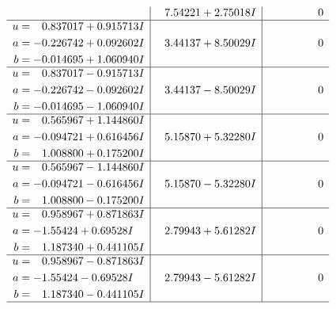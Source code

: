 \documentclass[1p]{elsarticle_modified}
\theoremstyle{definition}
\begin{document}
$$\begin{array}{c|c|c}
 & \phantom{-}7.54221 + 2.75018 I & \phantom{-0.000000 } 0 \\ \hline\begin{aligned}
u &= \phantom{-}0.837017 + 0.915713 I \\
a &= -0.226742 + 0.092602 I \\
b &= -0.014695 + 1.060940 I\end{aligned}
 & \phantom{-}3.44137 + 8.50029 I & \phantom{-0.000000 } 0 \\ \hline\begin{aligned}
u &= \phantom{-}0.837017 - 0.915713 I \\
a &= -0.226742 - 0.092602 I \\
b &= -0.014695 - 1.060940 I\end{aligned}
 & \phantom{-}3.44137 - 8.50029 I & \phantom{-0.000000 } 0 \\ \hline\begin{aligned}
u &= \phantom{-}0.565967 + 1.144860 I \\
a &= -0.094721 + 0.616456 I \\
b &= \phantom{-}1.008800 + 0.175200 I\end{aligned}
 & \phantom{-}5.15870 + 5.32280 I & \phantom{-0.000000 } 0 \\ \hline\begin{aligned}
u &= \phantom{-}0.565967 - 1.144860 I \\
a &= -0.094721 - 0.616456 I \\
b &= \phantom{-}1.008800 - 0.175200 I\end{aligned}
 & \phantom{-}5.15870 - 5.32280 I & \phantom{-0.000000 } 0 \\ \hline\begin{aligned}
u &= \phantom{-}0.958967 + 0.871863 I \\
a &= -1.55424 + 0.69528 I \\
b &= \phantom{-}1.187340 + 0.441105 I\end{aligned}
 & \phantom{-}2.79943 + 5.61282 I & \phantom{-0.000000 } 0 \\ \hline\begin{aligned}
u &= \phantom{-}0.958967 - 0.871863 I \\
a &= -1.55424 - 0.69528 I \\
b &= \phantom{-}1.187340 - 0.441105 I\end{aligned}
 & \phantom{-}2.79943 - 5.61282 I & \phantom{-0.000000 } 0\\
 \hline 
 \end{array}$$\newpage$$\begin{array}{c|c|c}  

\end{array}$$
\end{document}
